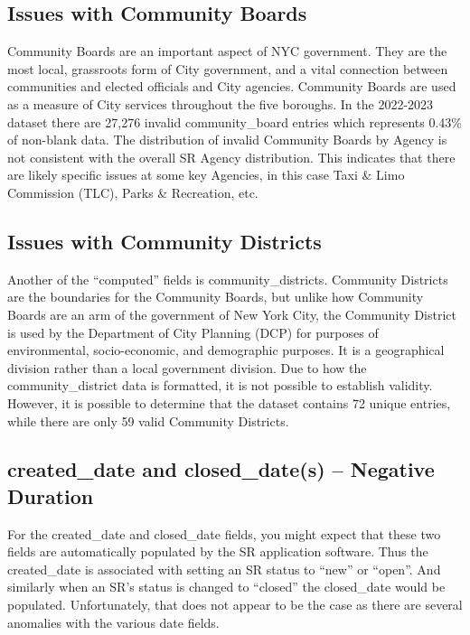 \documentclass[12pt, titlepage]{article}
\begin{document}
\subsection{Issues with Community Boards}
\label{sec:communityboards}
Community Boards are an important aspect of NYC government. They are the 
most local, grassroots form of City government, and a vital connection 
between communities and elected officials and City agencies. Community 
Boards are used as a measure of City services throughout the five 
boroughs. In the 2022-2023 dataset there are 27,276 invalid community\_board 
entries which represents 0.43\% of non-blank data. The distribution 
of invalid Community Boards by Agency is not consistent with 
the overall SR Agency distribution. This indicates that there are likely 
specific issues at some key Agencies, in this case Taxi \& Limo 
Commission (TLC), Parks \& Recreation, etc. 

\subsection{Issues with Community Districts}
\label{sec:communitydistrict}
Another of the ``computed'' fields is community\_districts. Community Districts 
are the boundaries for the Community Boards, but unlike how 
Community Boards are an arm of the government of New York City, 
the Community District is used by the Department of City Planning 
(DCP) for purposes of environmental, socio-economic, and demographic 
purposes. It is a geographical division rather than a local 
government division. Due to how the community\_district data 
is formatted, it is not possible to establish validity. However, 
it is possible to determine that the dataset contains 72 unique 
entries, while there are only 59 valid Community Districts. 
	
\subsection{created\_date and closed\_date(s) -- Negative Duration}
\label{sec:negativeduration}
For the created\_date and closed\_date fields, you might 
expect that these two fields are automatically populated by the 
SR application software. Thus the created\_date is associated with setting an SR status 
to ``new'' or ``open''. And similarly when an SR's 	status is 
changed to ``closed''  the closed\_date would be 
populated. Unfortunately, that does not appear to be the case as
there are several anomalies with the various date fields.
	
\end{document}
